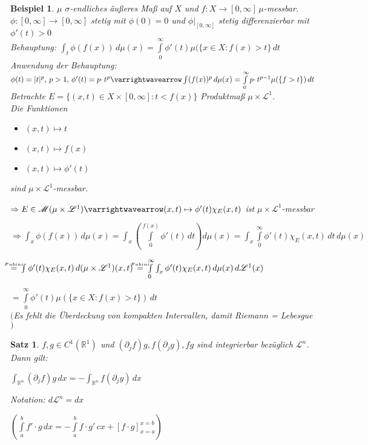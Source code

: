 \documentclass[11pt]{memoir}
\theoremstyle{changebreak}
\newtheorem{Beispiel}{Beispiel}[chapter]
\newtheorem{Satz}{Satz}[chapter]
\newcommand\overequal[1]{\mathrel{\overset{\makebox[0pt]{\mbox{\normalfont\tiny\sffamily $ #1 $}}}{=}}}
\begin{document}


\begin{Beispiel}
$\mu$ $\sigma$-endliches äußeres Maß auf $X$ und $f: X \rightarrow [0, \infty]\, \mu$-messbar. \\
$\phi: [0, \infty] \rightarrow [0, \infty]$ stetig mit $\phi(0) = 0$ und $\phi\lvert_{[0, \infty]}$ stetig differenzierbar mit $\phi'(t) >0$ \\
\emph{Behauptung}:
$\int_t \phi(f(x)) \, d\mu(x) = \int\limits_0^\infty \phi'(t)\mu(\{x \in X: f(x) >t\} \, dt$\\
\emph{Anwendung der Behauptung}:  \\
$\phi(t) = |t|^p, \, p>1, \, \phi'(t) = p \cdotp t^p \varrightwavearrow \int(f(x))^p \, d\mu(x) = \int\limits_0^\infty p\cdotp t^{p-1} \mu(\{f > t\}) \, dt$ \\
Betrachte $E = \{(x, t) \in X \times [0, \infty]: t < f(x)\}$ Produktmaß $\mu \times \mathscr L^1$. \\
Die Funktionen
\begin{itemize}
	\item $(x, t) \mapsto t$
	\item $(x, t) \mapsto f(x)$
	\item $(x, t) \mapsto \phi'(t)$
\end{itemize}
sind $\mu \times \mathscr L^1$-messbar. \\
\par
$\Rightarrow E \in \mathscr M(\mu \times \mathscr L^1) \varrightwavearrow (x, t) \mapsto \phi'(t) \chi_E(x, t)$ ist $\mu \times \mathscr L^1$-messbar \\
\par
$\Rightarrow \int_x \phi(f(x)) \, d\mu(x) = \int_x \left( \int\limits_0^{f(x)}\phi'(t)\, dt\right)d\mu(x) = \int_x\int\limits_0^\infty \phi'(t) \chi_E(x, t)\, dt \,d\mu(x)$
\par
$\overequal{Fubini}\, \int \phi'(t) \chi_E(x, t) \,d(\mu \times \mathscr L^1)(x, t) \,\overequal{Fubini} \,\int\limits_0^\infty \int_x \phi'(t)\chi_E(x, t) \,d\mu(x) \,d\mathscr L^1(x)$
\par
$ = \int\limits_0^\infty \phi'(t) \mu(\{x \in X: f(x) >t\})\, dt$ \\
$($Es fehlt die Überdeckung von kompakten Intervallen, damit Riemann = Lebesgue$)$
\end{Beispiel}

\begin{Satz}
$f, g\in C^1(\mathbb R^1)$ und $(\partial_j f)g, f(\partial_j g), fg$ sind integrierbar bezüglich $\mathscr L^n$. Dann gilt:
\begin{center}
	$\int_{\mathbb R^n} (\partial_j f)g \, dx = - \int_{\mathbb R^n} f(\partial_j y) \, dx$
	\par\bigskip
	\emph{Notation}: $d\mathscr L^n = dx$
	\par\bigskip
	$\left(\int\limits_a^b f' \cdotp g \,dx = -\int\limits_a^b f\cdotp g' \, cx + [f\cdotp g]_{x=a}^{x=b} \right)$
\end{center}
\end{Satz}
\end{document}
